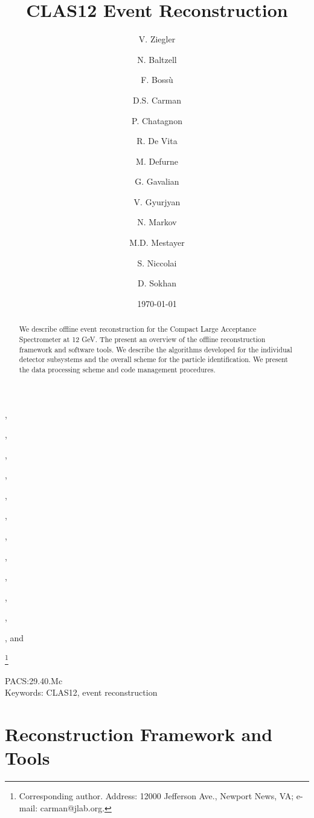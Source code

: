\documentclass{elsart}
\begin{document}
\begin{frontmatter}

\title{CLAS12 Event Reconstruction}

\author[JLab]{V. Ziegler},
\author[JLab]{N. Baltzell},
\author[Saclay]{F. Boss\`u},
\author[JLab]{D.S. Carman},
\author[IPNO]{P. Chatagnon},
\author[INFN]{R. De Vita},
\author[Saclay]{M. Defurne},
\author[JLab]{G. Gavalian},
\author[JLab]{V. Gyurjyan},
\author[JLab]{N. Markov},
\author[JLab]{M.D. Mestayer}, 
\author[IPNO]{S. Niccolai}, and
\author[Glasgow]{D. Sokhan}

\address[JLab]{Thomas Jefferson National Accelerator Facility, Newport News, VA 23606, USA}
\address[INFN]{INFN, Sezione di Genova, 16146 Genova, Italy}
\address[Saclay]{CEA-Saclay, Univ. Paris-Sud, Universit\'e Paris-Saclay, Gif-sur-Yvettes, France}
\address[IPNO]{Institut de Physique Nucl\'eaire, CNRS-IN2P3, Univ. Paris-Sud, Universit\'e Paris-Saclay,
  91406 Orsay Cedex, France}
\address[Glasgow]{University of Glasgow, Glasgow G12 8QQ, United Kingdom}
\thanks[corresponding]{Corresponding author. Address: 12000 Jefferson Ave., Newport News, VA; 
e-mail: carman@jlab.org.}

\date{\today}


\begin{abstract}
  We describe offline event reconstruction for the Compact Large Acceptance Spectrometer at 12 GeV.
  The present an overview of the offline reconstruction framework and software tools.  
  We describe the algorithms developed for the individual detector subsystems and the overall scheme for the
  particle identification.  We present the data processing scheme and code management procedures.
\end{abstract}

\end{frontmatter}

PACS:29.40.Mc \\
Keywords: CLAS12, event reconstruction
\newpage

\newpage
\tableofcontents

\vfil
\eject

\section{Reconstruction Framework and Tools}
\end{document}
